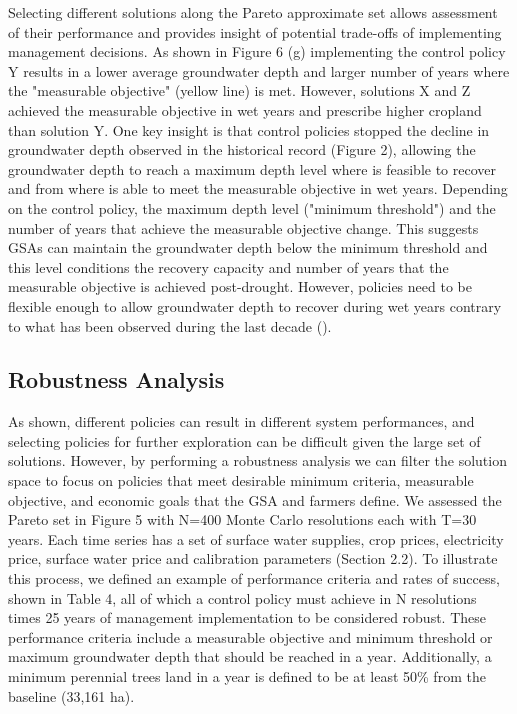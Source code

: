 \documentclass[11pt,a4paper]{article}
\begin{document}
Selecting different solutions along the Pareto approximate set allows assessment of their performance and provides insight of potential trade-offs of implementing management decisions. As shown in Figure 6 (g) implementing the control policy Y results in a lower average groundwater depth and larger number of years where the "measurable objective" (yellow line) is met. However, solutions X and Z achieved the measurable objective in wet years and prescribe higher cropland than solution Y. One key insight is that control policies stopped the decline in groundwater depth observed in the historical record (Figure 2), allowing the groundwater depth to reach a maximum depth level where is feasible to recover and from where is able to meet the measurable objective in wet years. Depending on the control policy, the maximum depth level ("minimum threshold") and the number of years that achieve the measurable objective change. This suggests GSAs can maintain the groundwater depth below the minimum threshold and this level conditions the recovery capacity and number of years that the measurable objective is achieved post-drought. However, policies need to be flexible enough to allow groundwater depth to recover during wet years contrary to what has been observed during the last decade (\cite{liu_groundwater_2022,alam_post-drought_2021}).

\subsection{Robustness Analysis}

As shown, different policies can result in different system performances, and selecting policies for further exploration can be difficult given the large set of solutions. However, by performing a robustness analysis we can filter the solution space to focus on policies that meet desirable minimum criteria, measurable objective, and economic goals that the GSA and farmers define. We assessed the Pareto set in Figure 5 with N=400 Monte Carlo resolutions each with T=30 years. Each time series has a set of surface water supplies, crop prices, electricity price, surface water price and calibration parameters (Section 2.2). To illustrate this process, we defined an example of performance criteria and rates of success, shown in Table 4, all of which a control policy must achieve in N resolutions times 25 years of management implementation to be considered robust. These performance criteria include a measurable objective and minimum threshold or maximum groundwater depth that should be reached in a year. Additionally, a minimum perennial trees land in a year is defined to be at least 50\% from the baseline (33,161 ha). 
\end{document}
